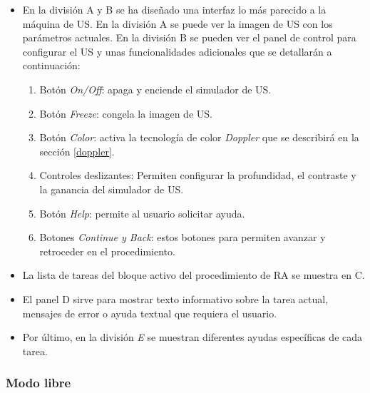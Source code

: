 \begin{itemize}
    \item En la división A y B se ha diseñado una interfaz lo más parecido a la máquina de \ac{US}.%
    En la división A se puede ver la imagen de \ac{US} con los parámetros actuales. En la división B se pueden ver el panel de control para configurar el \ac{US} y unas funcionalidades adicionales que se detallarán a continuación:
    \begin{enumerate}
        
        \item Botón \emph{On/Off}: apaga y enciende el simulador de \ac{US}.
        \item Botón \emph{Freeze}: congela la imagen de \ac{US}.
 \item Botón \emph{Color}: activa la tecnología de color \emph{Doppler} que se describirá en la sección \ref{doppler}.
\item Controles deslizantes: Permiten configurar la profundidad, el contraste y la ganancia del simulador de \ac{US}.
        \item Botón \emph{Help}: permite al usuario solicitar ayuda.
        \item Botones \emph{Continue y Back}: estos botones para permiten avanzar y retroceder en el procedimiento. 
    \end{enumerate}
    \item La lista de tareas del bloque activo del procedimiento de \ac{RA} se muestra en C.
    \item El panel D sirve para mostrar texto informativo sobre la tarea actual, mensajes de error o ayuda textual que requiera el usuario.
    \item Por último, en la división \emph{E} se muestran diferentes ayudas específicas de cada tarea.
\end{itemize}





\subsubsection{Modo libre}

